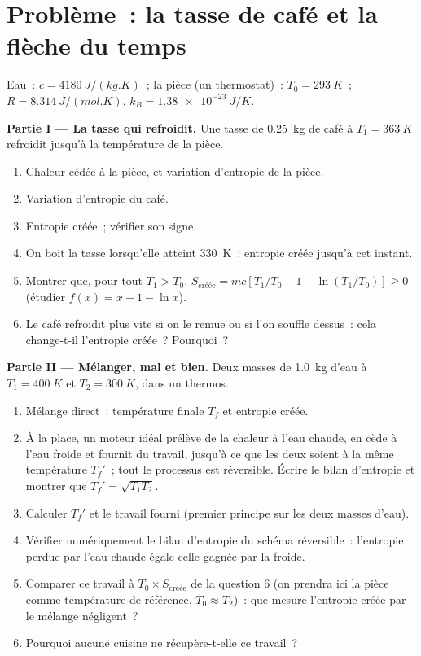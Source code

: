\section{Problème~: la tasse de café et la flèche du temps}

\begin{problem}
\label{pb:b1:second-law-entropy:1}
Eau~: $c = \qty{4180}{J/(kg.K)}$~; la pièce (un thermostat)~: $T_0 = \qty{293}{K}$~;
$R = \qty{8.314}{J/(mol.K)}$, $k_B = \qty{1.38e-23}{J/K}$.

\medskip
\noindent\textbf{Partie I --- La tasse qui refroidit.}
Une tasse de \qty{0.25}{kg} de café à $T_1 = \qty{363}{K}$ refroidit jusqu'à
la température de la pièce.
\begin{enumerate}
  \item Chaleur cédée à la pièce, et variation d'entropie de la pièce.
  \item Variation d'entropie du café.
  \item Entropie créée~; vérifier son signe.
  \item On boit la tasse lorsqu'elle atteint \qty{330}{K}~: entropie créée
        jusqu'à cet instant.
  \item Montrer que, pour tout $T_1 > T_0$, $S_{\text{créée}} = mc[T_1/T_0 - 1 -
        \ln(T_1/T_0)] \geq 0$ (étudier $f(x) = x - 1 - \ln x$).
  \item Le café refroidit plus vite si on le remue ou si l'on souffle
        dessus~: cela change-t-il l'entropie créée~? Pourquoi~?
\end{enumerate}

\medskip
\noindent\textbf{Partie II --- Mélanger, mal et bien.}
Deux masses de \qty{1.0}{kg} d'eau à $T_1 = \qty{400}{K}$ et $T_2 =
\qty{300}{K}$, dans un thermos.
\begin{enumerate}[resume]
  \item Mélange direct~: température finale $T_f$ et entropie créée.
  \item À la place, un moteur idéal prélève de la chaleur à l'eau chaude,
        en cède à l'eau froide et fournit du travail, jusqu'à ce que les
        deux soient à la même température $T_f'$~; tout le processus est
        réversible. Écrire le bilan d'entropie et montrer que $T_f' = \sqrt{T_1T_2}$.
  \item Calculer $T_f'$ et le travail fourni (premier principe sur les deux
        masses d'eau).
  \item Vérifier numériquement le bilan d'entropie du schéma réversible~:
        l'entropie perdue par l'eau chaude égale celle gagnée par la froide.
  \item Comparer ce travail à $T_0 \times S_{\text{créée}}$ de la question 6
        (on prendra ici la pièce comme température de référence, $T_0 \approx T_2$)~:
        que mesure l'entropie créée par le mélange négligent~?
  \item Pourquoi aucune cuisine ne récupère-t-elle ce travail~?
\end{enumerate}


\end{problem}
